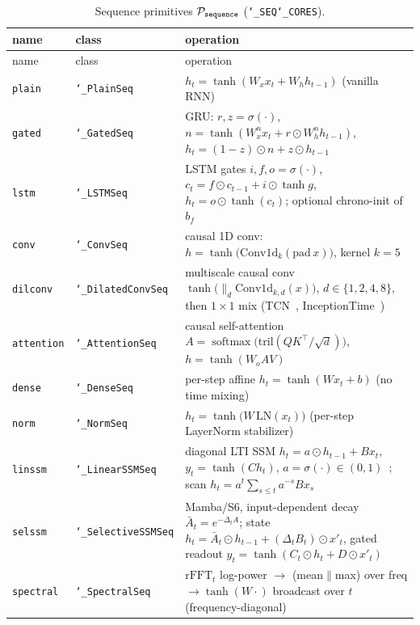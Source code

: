 \documentclass[11pt]{article}
\newcommand{\allowbreakhere}{\discretionary{}{}{}}
\newcommand{\code}[1]{\texttt{\def\_{\char`_\allowbreakhere}#1}}
\newcommand{\Pcal}{\mathcal{P}}
\newcommand{\softmax}{\operatorname{softmax}}
\newcommand{\sig}{\sigma}
\begin{document}
\begin{center}
\footnotesize
\renewcommand{\arraystretch}{1.35}
\begin{longtable}{@{}p{1.55cm}p{2.5cm}p{9.4cm}@{}}
\caption{Sequence primitives $\Pcal_{\code{sequence}}$ (\code{\_SEQ\_CORES}).}\label{tab:seq}\\
\toprule
name & class & operation\\
\midrule
\endfirsthead
\toprule name & class & operation\\ \midrule \endhead
\code{plain}   & \code{\_PlainSeq}   & $h_t=\tanh(W_x x_t + W_h h_{t-1})$ (vanilla RNN)\\
\code{gated}   & \code{\_GatedSeq}   & GRU: $r,z=\sig(\cdot)$, $n=\tanh(W^n_x x_t + r\odot W^n_h h_{t-1})$, $h_t=(1{-}z)\odot n + z\odot h_{t-1}$\\
\code{lstm}    & \code{\_LSTMSeq}    & LSTM gates $i,f,o=\sig(\cdot)$, $c_t=f\odot c_{t-1}+i\odot\tanh g$, $h_t=o\odot\tanh(c_t)$; optional chrono-init of $b_f$~\cite{tallec2018chrono}\\
\code{conv}    & \code{\_ConvSeq}    & causal 1D conv: $h=\tanh\big(\mathrm{Conv1d}_{k}(\text{pad}\,x)\big)$, kernel $k{=}5$\\
\code{dilconv} & \code{\_DilatedConvSeq} & multiscale causal conv $\tanh\big(\big\|_{d}\mathrm{Conv1d}_{k,d}(x)\big)$, $d\in\{1,2,4,8\}$, then $1{\times}1$ mix (TCN~\cite{bai2018tcn}, InceptionTime~\cite{ismail2020inceptiontime})\\
\code{attention}& \code{\_AttentionSeq}& causal self-attention $A=\softmax\!\big(\text{tril}(QK^\top/\sqrt{d})\big)$, $h=\tanh(W_o AV)$\\
\code{dense}   & \code{\_DenseSeq}   & per-step affine $h_t=\tanh(W x_t+b)$ (no time mixing)\\
\code{norm}    & \code{\_NormSeq}    & $h_t=\tanh\big(W\,\mathrm{LN}(x_t)\big)$ (per-step LayerNorm stabilizer)\\
\code{linssm}  & \code{\_LinearSSMSeq}& diagonal LTI SSM $h_t=a\odot h_{t-1}+B x_t$, $y_t=\tanh(C h_t)$, $a=\sig(\cdot)\!\in\!(0,1)$~\cite{gu2022s4,smith2023s5}; scan $h_t=a^{t}\!\sum_{s\le t}a^{-s}B x_s$\\
\code{selssm}  & \code{\_SelectiveSSMSeq}& Mamba/S6, input-dependent decay $\bar A_t=e^{-\Delta_t A}$; state $h_t=\bar A_t\odot h_{t-1}+(\Delta_t B_t)\odot x'_t$, gated readout $y_t=\tanh(C_t\odot h_t + D\odot x'_t)$~\cite{gu2023mamba}\\
\code{spectral}& \code{\_SpectralSeq}& $\mathrm{rFFT}_t$ log-power $\to$ (mean$\|$max) over freq $\to \tanh(W\cdot)$ broadcast over $t$ (frequency-diagonal)\\
\bottomrule
\end{longtable}
\end{center}
\end{document}
